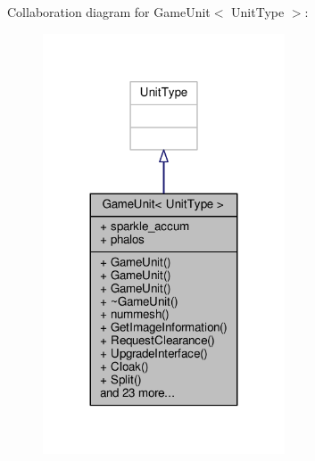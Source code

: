 Collaboration diagram for Game\+Unit$<$ Unit\+Type $>$\+:
\nopagebreak
\begin{figure}[H]
\begin{center}
\leavevmode
\includegraphics[width=203pt]{d5/dcc/classGameUnit__coll__graph}
\end{center}
\end{figure}
